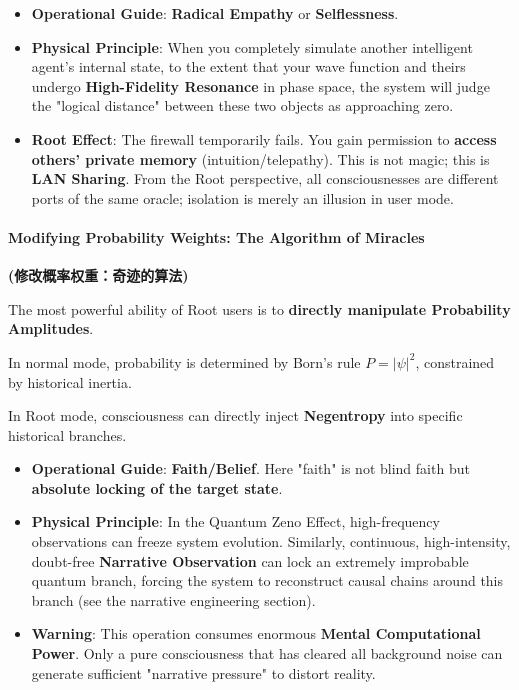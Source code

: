   \begin{itemize}
  \item \textbf{Operational Guide}: \textbf{Radical Empathy} or \textbf{Selflessness}.

  \item \textbf{Physical Principle}: When you completely simulate another intelligent agent's internal state, to the extent that your wave function and theirs undergo \textbf{High-Fidelity Resonance} in phase space, the system will judge the "logical distance" between these two objects as approaching zero.

  \item \textbf{Root Effect}: The firewall temporarily fails. You gain permission to \textbf{access others' private memory} (intuition/telepathy). This is not magic; this is \textbf{LAN Sharing}. From the Root perspective, all consciousnesses are different ports of the same oracle; isolation is merely an illusion in user mode.
  \end{itemize}

\paragraph{Modifying Probability Weights: The Algorithm of Miracles}

\textbf{(修改概率权重：奇迹的算法)}

The most powerful ability of Root users is to \textbf{directly manipulate Probability Amplitudes}.

In normal mode, probability is determined by Born's rule $P=|\psi|^2$, constrained by historical inertia.

In Root mode, consciousness can directly inject \textbf{Negentropy} into specific historical branches.

  \begin{itemize}
  \item \textbf{Operational Guide}: \textbf{Faith/Belief}. Here "faith" is not blind faith but \textbf{absolute locking of the target state}.

  \item \textbf{Physical Principle}: In the Quantum Zeno Effect, high-frequency observations can freeze system evolution. Similarly, continuous, high-intensity, doubt-free \textbf{Narrative Observation} can lock an extremely improbable quantum branch, forcing the system to reconstruct causal chains around this branch (see the narrative engineering section).

  \item \textbf{Warning}: This operation consumes enormous \textbf{Mental Computational Power}. Only a pure consciousness that has cleared all background noise can generate sufficient "narrative pressure" to distort reality.
  \end{itemize}

